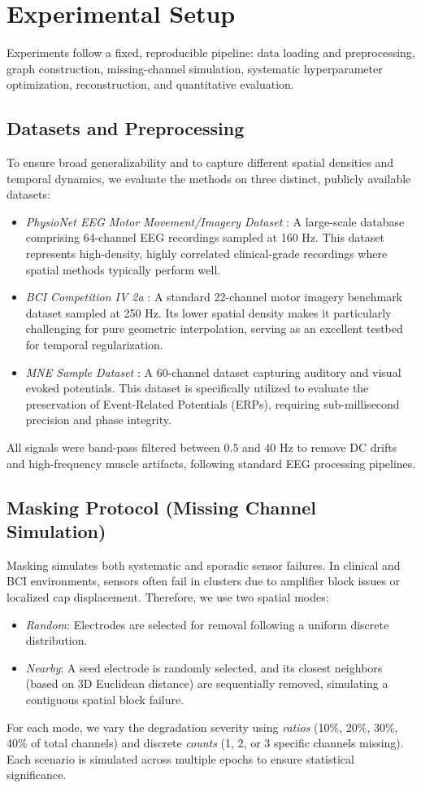 \section{Experimental Setup}

Experiments follow a fixed, reproducible pipeline: data loading and preprocessing, graph construction, missing-channel simulation, systematic hyperparameter optimization, reconstruction, and quantitative evaluation.

\subsection{Datasets and Preprocessing}
To ensure broad generalizability and to capture different spatial densities and temporal dynamics, we evaluate the methods on three distinct, publicly available datasets:
\begin{itemize}
\item \emph{PhysioNet EEG Motor Movement/Imagery Dataset} \cite{schalk2004bci2000}: A large-scale database comprising 64-channel EEG recordings sampled at 160 Hz. This dataset represents high-density, highly correlated clinical-grade recordings where spatial methods typically perform well.
\item \emph{BCI Competition IV 2a} \cite{tangermann2012bci}: A standard 22-channel motor imagery benchmark dataset sampled at 250 Hz. Its lower spatial density makes it particularly challenging for pure geometric interpolation, serving as an excellent testbed for temporal regularization.
\item \emph{MNE Sample Dataset} \cite{gramfort2013meg}: A 60-channel dataset capturing auditory and visual evoked potentials. This dataset is specifically utilized to evaluate the preservation of Event-Related Potentials (ERPs), requiring sub-millisecond precision and phase integrity.
\end{itemize}
All signals were band-pass filtered between $0.5$ and $40$ Hz to remove DC drifts and high-frequency muscle artifacts, following standard EEG processing pipelines.

\subsection{Masking Protocol (Missing Channel Simulation)}
Masking simulates both systematic and sporadic sensor failures. In clinical and BCI environments, sensors often fail in clusters due to amplifier block issues or localized cap displacement. Therefore, we use two spatial modes:
\begin{itemize}
\item \emph{Random}: Electrodes are selected for removal following a uniform discrete distribution.
\item \emph{Nearby}: A seed electrode is randomly selected, and its closest neighbors (based on 3D Euclidean distance) are sequentially removed, simulating a contiguous spatial block failure.
\end{itemize}
For each mode, we vary the degradation severity using \emph{ratios} (10\%, 20\%, 30\%, 40\% of total channels) and discrete \emph{counts} (1, 2, or 3 specific channels missing). Each scenario is simulated across multiple epochs to ensure statistical significance.

